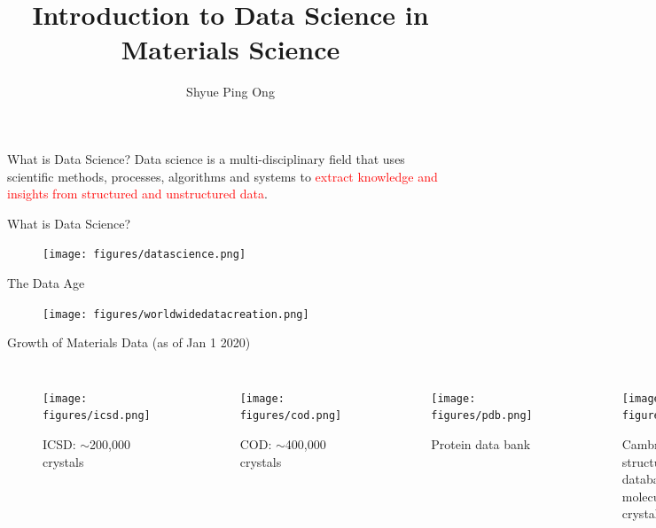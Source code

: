 \documentclass[aspectratio=169]{beamer}
\title[Introduction to Data Science in Materials Science]{Introduction to Data Science in Materials Science}
\author{Shyue Ping Ong}
\institute[UCSD]{University of California, San Diego\\
\medskip
}
\date{\classyear} %
\begin{document}
    \begin{frame}
        \titlepage %
    \end{frame}





    \begin{frame}{What is Data Science?}
        \Huge{Data science is a multi-disciplinary field that uses scientific methods, processes, algorithms and systems to \textcolor{red}{extract knowledge and insights from structured and unstructured data}.}
    \end{frame}


    \begin{frame}{What is Data Science?}
        \begin{figure}
            \centering
            \texttt{[image: figures/datascience.png]}
        \end{figure}
    \end{frame}

    \begin{frame}{The Data Age}
        \begin{figure}
            \centering
            \texttt{[image: figures/worldwidedatacreation.png]}
        \end{figure}
    \end{frame}

    \begin{frame}{Growth of Materials Data (as of Jan 1 2020)}

        \begin{columns}
            \begin{figure}
                \centering
                \texttt{[image: figures/icsd.png]}
                \caption{ICSD: $\sim$200,000 crystals
                }
            \end{figure}
            \begin{figure}
                \centering
                \texttt{[image: figures/cod.png]}
                \caption{COD: $\sim$400,000 crystals
                }
            \end{figure}

            \begin{figure}
                \centering
                \texttt{[image: figures/pdb.png]}
                \caption{Protein data bank}
            \end{figure}
            \begin{figure}
                \centering
                \texttt{[image: figures/csd.png]}
                \caption{Cambridge structural database (small-molecule organic crystal structures)}
            \end{figure}
        \end{columns}
    \end{frame}
\end{document}
